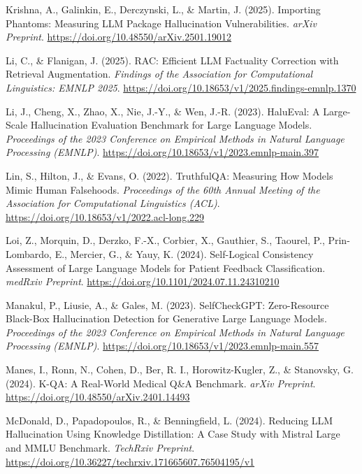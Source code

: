 \documentclass[
  11pt,
  a4paper,
]{article}
\newlength{\cslhangindent}
\newenvironment{CSLReferences}[2] %
 {\begin{list}{}{%
  \setlength{\itemindent}{0pt}
  \setlength{\leftmargin}{0pt}
  \setlength{\parsep}{0pt}
  \ifodd #1
   \setlength{\leftmargin}{\cslhangindent}
   \setlength{\itemindent}{-1\cslhangindent}
  \fi
  \setlength{\itemsep}{#2\baselineskip}}}
 {\end{list}}
\begin{document}
\begin{CSLReferences}{1}{0}
Krishna, A., Galinkin, E., Derczynski, L., \& Martin, J. (2025).
{Importing Phantoms: Measuring LLM Package Hallucination
Vulnerabilities}. \emph{arXiv Preprint}.
\url{https://doi.org/10.48550/arXiv.2501.19012}

Li, C., \& Flanigan, J. (2025). {RAC: Efficient LLM Factuality
Correction with Retrieval Augmentation}. \emph{Findings of the
Association for Computational Linguistics: EMNLP 2025}.
\url{https://doi.org/10.18653/v1/2025.findings-emnlp.1370}

Li, J., Cheng, X., Zhao, X., Nie, J.-Y., \& Wen, J.-R. (2023).
{HaluEval: A Large-Scale Hallucination Evaluation Benchmark for Large
Language Models}. \emph{Proceedings of the 2023 Conference on Empirical
Methods in Natural Language Processing (EMNLP)}.
\url{https://doi.org/10.18653/v1/2023.emnlp-main.397}

Lin, S., Hilton, J., \& Evans, O. (2022). {TruthfulQA: Measuring How
Models Mimic Human Falsehoods}. \emph{Proceedings of the 60th Annual
Meeting of the Association for Computational Linguistics (ACL)}.
\url{https://doi.org/10.18653/v1/2022.acl-long.229}

Loi, Z., Morquin, D., Derzko, F.-X., Corbier, X., Gauthier, S., Taourel,
P., Prin-Lombardo, E., Mercier, G., \& Yauy, K. (2024). {Self-Logical
Consistency Assessment of Large Language Models for Patient Feedback
Classification}. \emph{medRxiv Preprint}.
\url{https://doi.org/10.1101/2024.07.11.24310210}

Manakul, P., Liusie, A., \& Gales, M. (2023). {SelfCheckGPT:
Zero-Resource Black-Box Hallucination Detection for Generative Large
Language Models}. \emph{Proceedings of the 2023 Conference on Empirical
Methods in Natural Language Processing (EMNLP)}.
\url{https://doi.org/10.18653/v1/2023.emnlp-main.557}

Manes, I., Ronn, N., Cohen, D., Ber, R. I., Horowitz-Kugler, Z., \&
Stanovsky, G. (2024). {K-QA: A Real-World Medical Q\&A Benchmark}.
\emph{arXiv Preprint}. \url{https://doi.org/10.48550/arXiv.2401.14493}

McDonald, D., Papadopoulos, R., \& Benningfield, L. (2024). {Reducing
LLM Hallucination Using Knowledge Distillation: A Case Study with
Mistral Large and MMLU Benchmark}. \emph{TechRxiv Preprint}.
\url{https://doi.org/10.36227/techrxiv.171665607.76504195/v1}


\end{CSLReferences}
\end{document}
